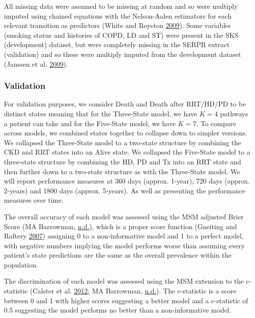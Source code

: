 \documentclass[
]{article}
\begin{document}
All missing data were assumed to be missing at random and so were multiply imputed using chained equations with the Nelson-Aalen estimators for each relevant transition as predictors (White and Royston \protect\hyperlink{ref-white_imputing_2009}{2009}). Some variables (smoking status and histories of COPD, LD and ST) were present in the SKS (development) dataset, but were completely missing in the SERPR extract (validation) and so these were multiply imputed from the development dataset (Janssen et al. \protect\hyperlink{ref-janssen_dealing_2009}{2009}).

\hypertarget{validation-2}{%
\subsubsection{Validation}\label{validation-2}}

For validation purposes, we consider Death and Death after RRT/HD/PD to be distinct states meaning that for the Three-State model, we have \(K=4\) pathways a patient can take and for the Five-State model, we have \(K=7\). To compare across models, we combined states together to collapse down to simpler versions. We collapsed the Three-State model to a two-state structure by combining the CKD and RRT states into an Alive state. We collapsed the Five-State model to a three-state structure by combining the HD, PD and Tx into an RRT state and then further down to a two-state structure as with the Three-State model. We will report performance measures at 360 days (approx. 1-year), 720 days (approx. 2-years) and 1800 days (approx. 5-years). As well as presenting the performance measures over time.

The overall accuracy of each model was assessed using the MSM adjusted Brier Score (MA Barrowman, \protect\hyperlink{ref-chap-performance-metrics}{n.d.}), which is a proper score function (Gneiting and Raftery \protect\hyperlink{ref-gneiting_strictly_2007}{2007}) assigning 0 to a non-informative model and 1 to a perfect model, with negative numbers implying the model performs worse than assuming every patient's state predictions are the same as the overall prevalence within the population.

The discrimination of each model was assessed using the MSM extension to the c-statistic (Calster et al. \protect\hyperlink{ref-calster_extending_2012-1}{2012}; MA Barrowman, \protect\hyperlink{ref-chap-performance-metrics}{n.d.}). The c-statistic is a score between 0 and 1 with higher scores suggesting a better model and a c-statistic of 0.5 suggesting the model performs no better than a non-informative model.
\end{document}
